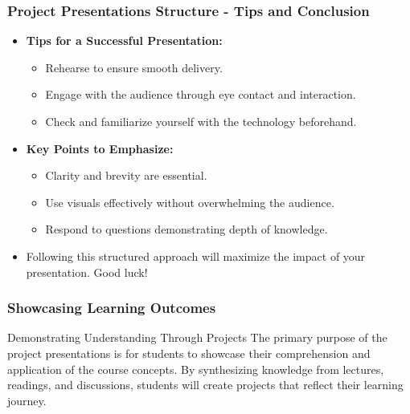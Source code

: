 \documentclass[aspectratio=169]{beamer}
\begin{document}
\begin{frame}[fragile]
    \frametitle{Project Presentations Structure - Tips and Conclusion}
    \begin{itemize}
        \item \textbf{Tips for a Successful Presentation:}
            \begin{itemize}
                \item Rehearse to ensure smooth delivery.
                \item Engage with the audience through eye contact and interaction.
                \item Check and familiarize yourself with the technology beforehand.
            \end{itemize}

        \item \textbf{Key Points to Emphasize:}
            \begin{itemize}
                \item Clarity and brevity are essential.
                \item Use visuals effectively without overwhelming the audience.
                \item Respond to questions demonstrating depth of knowledge.
            \end{itemize}
        \item Following this structured approach will maximize the impact of your presentation. Good luck!
    \end{itemize}
\end{frame}

\begin{frame}[fragile]
    \frametitle{Showcasing Learning Outcomes}
    \begin{block}{Demonstrating Understanding Through Projects}
        The primary purpose of the project presentations is for students to showcase their comprehension and application of the course concepts. By synthesizing knowledge from lectures, readings, and discussions, students will create projects that reflect their learning journey.
    \end{block}
\end{frame}
\end{document}

